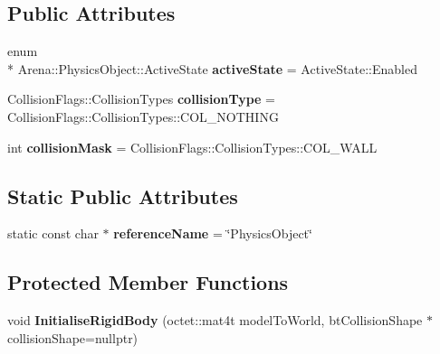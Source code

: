 \subsection*{Public Attributes}
\begin{DoxyCompactItemize}
\item 
\hypertarget{class_arena_1_1_physics_object_a6ea66a4167ec40c6a6e42304f333e4b9}{enum \\*
Arena\+::\+Physics\+Object\+::\+Active\+State {\bfseries active\+State} = Active\+State\+::\+Enabled}\label{class_arena_1_1_physics_object_a6ea66a4167ec40c6a6e42304f333e4b9}

\item 
\hypertarget{class_arena_1_1_physics_object_a5c51d2f7f8f4ea3484595cf0df5df39d}{Collision\+Flags\+::\+Collision\+Types {\bfseries collision\+Type} = Collision\+Flags\+::\+Collision\+Types\+::\+C\+O\+L\+\_\+\+N\+O\+T\+H\+I\+N\+G}\label{class_arena_1_1_physics_object_a5c51d2f7f8f4ea3484595cf0df5df39d}

\item 
\hypertarget{class_arena_1_1_physics_object_af218fdf9948bd046a16b078d1789bb38}{int {\bfseries collision\+Mask} = Collision\+Flags\+::\+Collision\+Types\+::\+C\+O\+L\+\_\+\+W\+A\+L\+L}\label{class_arena_1_1_physics_object_af218fdf9948bd046a16b078d1789bb38}

\end{DoxyCompactItemize}
\subsection*{Static Public Attributes}
\begin{DoxyCompactItemize}
\item 
\hypertarget{class_arena_1_1_physics_object_ae91e377385b599d597ec997158359820}{static const char $\ast$ {\bfseries reference\+Name} = \char`\"{}Physics\+Object\char`\"{}}\label{class_arena_1_1_physics_object_ae91e377385b599d597ec997158359820}

\end{DoxyCompactItemize}
\subsection*{Protected Member Functions}
\begin{DoxyCompactItemize}
\item 
\hypertarget{class_arena_1_1_physics_object_a9e10bdfe72672967777e52ca51d5682a}{void {\bfseries Initialise\+Rigid\+Body} (octet\+::mat4t model\+To\+World, bt\+Collision\+Shape $\ast$collision\+Shape=nullptr)}\label{class_arena_1_1_physics_object_a9e10bdfe72672967777e52ca51d5682a}

\end{DoxyCompactItemize}
